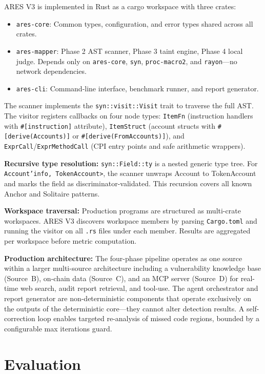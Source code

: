 \documentclass[conference]{IEEEtran}
\begin{document}
ARES V3 is implemented in Rust as a cargo workspace with three crates:

\begin{itemize}
  \item {\tt ares-core}: Common types, configuration, and error types shared across all crates.
  \item {\tt ares-mapper}: Phase 2 AST scanner, Phase 3 taint engine, Phase 4 local judge. Depends only on {\tt ares-core}, {\tt syn}, {\tt proc-macro2}, and {\tt rayon}---no network dependencies.
  \item {\tt ares-cli}: Command-line interface, benchmark runner, and report generator.
\end{itemize}

The scanner implements the {\tt syn::visit::Visit} trait to traverse the full AST. The visitor registers callbacks on four node types: {\tt ItemFn} (instruction handlers with {\tt \#[instruction]} attribute), {\tt ItemStruct} (account structs with {\tt \#[derive(Accounts)]} or {\tt \#[derive(FromAccounts)]}), and {\tt ExprCall}/{\tt ExprMethodCall} (CPI entry points and safe arithmetic wrappers).

{\bf Recursive type resolution:} {\tt syn::Field::ty} is a nested generic type tree. For {\tt Account'{}info, TokenAccount>}, the scanner unwraps Account to TokenAccount and marks the field as discriminator-validated. This recursion covers all known Anchor and Solitaire patterns.

{\bf Workspace traversal:} Production programs are structured as multi-crate workspaces. ARES V3 discovers workspace members by parsing {\tt Cargo.toml} and running the visitor on all {\tt .rs} files under each member. Results are aggregated per workspace before metric computation.

{\bf Production architecture:} The four-phase pipeline operates as one source within a larger multi-source architecture including a vulnerability knowledge base (Source~B), on-chain data (Source~C), and an MCP server (Source~D) for real-time web search, audit report retrieval, and tool-use. The agent orchestrator and report generator are non-deterministic components that operate exclusively on the outputs of the deterministic core---they cannot alter detection results. A self-correction loop enables targeted re-analysis of missed code regions, bounded by a configurable max iterations guard.

\section{Evaluation}
\label{sec:eval}
\end{document}
